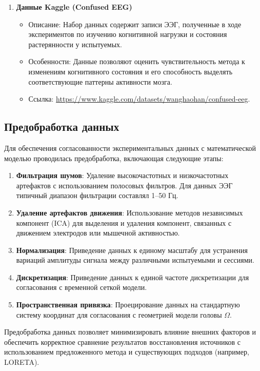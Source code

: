 \documentclass[sn-mathphys-num]{bst/sn-jnl}
\theoremstyle{thmstylethree}
\theoremstyle{thmstyletwo}
\theoremstyle{thmstyleone}
\begin{document}
\begin{enumerate}
    \item \textbf{Данные Kaggle (Confused EEG)}
    \begin{itemize}
        \item Описание: Набор данных содержит записи ЭЭГ, полученные в ходе экспериментов по изучению когнитивной нагрузки и состояния растерянности у испытуемых.
        \item Особенности: Данные позволяют оценить чувствительность метода к изменениям когнитивного состояния и его способность выделять соответствующие паттерны активности мозга.
        \item Ссылка: \url{https://www.kaggle.com/datasets/wanghaohan/confused-eeg}.
    \end{itemize}
\end{enumerate}

\subsection{Предобработка данных}

Для обеспечения согласованности экспериментальных данных с математической моделью проводилась предобработка, включающая следующие этапы:

\begin{enumerate}
    \item \textbf{Фильтрация шумов}: Удаление высокочастотных и низкочастотных артефактов с использованием полосовых фильтров. Для данных ЭЭГ типичный диапазон фильтрации составлял 1–50 Гц.
    \item \textbf{Удаление артефактов движения}: Использование методов независимых компонент (ICA) для выделения и удаления компонент, связанных с движением электродов или мышечной активностью.
    \item \textbf{Нормализация}: Приведение данных к единому масштабу для устранения вариаций амплитуды сигнала между различными испытуемыми и сессиями.
    \item \textbf{Дискретизация}: Приведение данных к единой частоте дискретизации для согласования с временной сеткой модели.
    \item \textbf{Пространственная привязка}: Проецирование данных на стандартную систему координат для согласования с геометрией модели головы $\Omega$.
\end{enumerate}

Предобработка данных позволяет минимизировать влияние внешних факторов и обеспечить корректное сравнение результатов восстановления источников с использованием предложенного метода и существующих подходов (например, LORETA).
\end{document}
